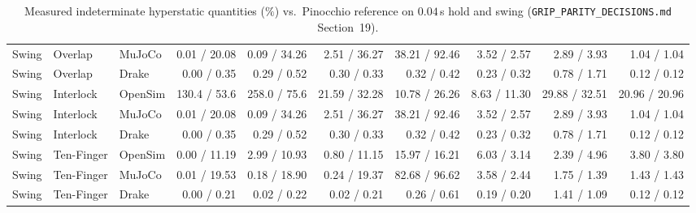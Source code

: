 \documentclass[11pt,a4paper]{article}
\begin{document}
\begin{table}[htbp]
\begin{tabular}{lllrrrrrrr}
Swing & Overlap & MuJoCo & 0.01 / 20.08 & 0.09 / 34.26 & 2.51 / 36.27 & 38.21 / 92.46 & 3.52 / 2.57 & 2.89 / 3.93 & 1.04 / 1.04 \\
Swing & Overlap & Drake & 0.00 / 0.35 & 0.29 / 0.52 & 0.30 / 0.33 & 0.32 / 0.42 & 0.23 / 0.32 & 0.78 / 1.71 & 0.12 / 0.12 \\
Swing & Interlock & OpenSim & 130.4 / 53.6 & 258.0 / 75.6 & 21.59 / 32.28 & 10.78 / 26.26 & 8.63 / 11.30 & 29.88 / 32.51 & 20.96 / 20.96 \\
Swing & Interlock & MuJoCo & 0.01 / 20.08 & 0.09 / 34.26 & 2.51 / 36.27 & 38.21 / 92.46 & 3.52 / 2.57 & 2.89 / 3.93 & 1.04 / 1.04 \\
Swing & Interlock & Drake & 0.00 / 0.35 & 0.29 / 0.52 & 0.30 / 0.33 & 0.32 / 0.42 & 0.23 / 0.32 & 0.78 / 1.71 & 0.12 / 0.12 \\
Swing & Ten-Finger & OpenSim & 0.00 / 11.19 & 2.99 / 10.93 & 0.80 / 11.15 & 15.97 / 16.21 & 6.03 / 3.14 & 2.39 / 4.96 & 3.80 / 3.80 \\
Swing & Ten-Finger & MuJoCo & 0.01 / 19.53 & 0.18 / 18.90 & 0.24 / 19.37 & 82.68 / 96.62 & 3.58 / 2.44 & 1.75 / 1.39 & 1.43 / 1.43 \\
Swing & Ten-Finger & Drake & 0.00 / 0.21 & 0.02 / 0.22 & 0.02 / 0.21 & 0.26 / 0.61 & 0.19 / 0.20 & 1.41 / 1.09 & 0.12 / 0.12 \\
\bottomrule
\end{tabular}
\caption{Measured indeterminate hyperstatic quantities ($\%$) vs.\ Pinocchio reference on $0.04$\,s hold and swing (\texttt{GRIP\_PARITY\_DECISIONS.md} Section~19).}
\label{tab:g10_indeterminate_series}
\end{table}
\end{document}
